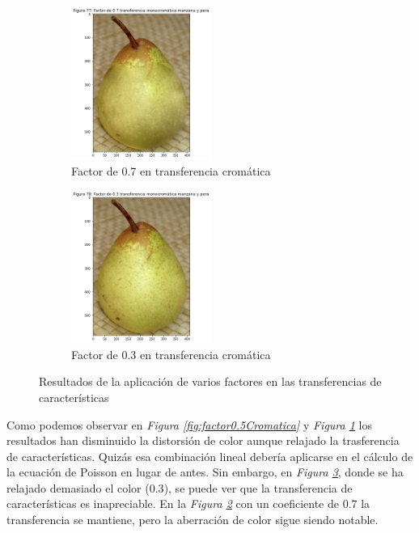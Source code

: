 \documentclass[11pt,twoside,titlepage,a4paper]{article}
\numberwithin{equation}{section} %
\theoremstyle{usual}
\begin{document}
\begin{figure}[h]
\begin{subfigure}[t]{.3\textwidth}
        \label{fig:factor0.5Mono}
    \end{subfigure}
    \centering
    \begin{subfigure}[t]{.3\textwidth}
        \centering
        \captionsetup{justification=centering}
        \includegraphics[height=5cm]{imagenes/PoissonImageEditing_cell_84_output_3.png}
        \caption{Factor de 0.7 en transferencia cromática}
        \label{fig:factor0.7Mono}
    \end{subfigure}%
    \centering
    \begin{subfigure}[t]{.3\textwidth}
        \centering
        \captionsetup{justification=centering}
        \includegraphics[height=5cm]{imagenes/PoissonImageEditing_cell_84_output_4.png}
        \caption{Factor de 0.3 en transferencia cromática}
        \label{fig:factor0.3Mono}
    \end{subfigure}
    \centering
    \caption{Resultados de la aplicación de varios factores en las transferencias de características}
    \label{fig:aplicacionFactoresIntercambio}
\end{figure}

Como podemos observar en \textit{Figura \ref{fig:factor0.5Cromatica}}  y \textit{Figura \ref{fig:factor0.5Mono}} los resultados han disminuido la distorsión de color aunque relajado la trasferencia de características. Quizás esa combinación lineal debería aplicarse en el cálculo de la ecuación de Poisson en lugar de antes. Sin embargo, en  \textit{Figura \ref{fig:factor0.3Mono}}, donde se ha relajado demasiado el color ($0.3$), se puede ver que la transferencia de características es inapreciable. En la  \textit{Figura \ref{fig:factor0.7Mono}} con un coeficiente de $0.7$ la transferencia se mantiene, pero la aberración de color sigue siendo notable. 
\end{document}
